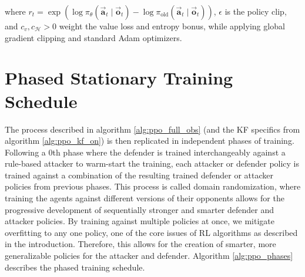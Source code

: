 where \(r_t=\exp\!\left(\log\pi_\theta(\vec{\mathbf{a}}_t \mid \vec{\mathbf{o}}_t)-\log\pi_{\mathrm{old}}(\vec{\mathbf{a}}_t \mid \vec{\mathbf{o}}_t)\right)\),
\(\epsilon\) is the policy clip, and \(c_v,c_{\mathcal{H}}>0\) weight the value loss and entropy bonus, while applying global gradient clipping and standard Adam optimizers.


\section{Phased Stationary Training Schedule}
\label{sec:phased-stationary-training}

The process described in algorithm \ref{alg:ppo_full_obs} (and the KF specifics from algorithm \ref{alg:ppo_kf_on}) is then replicated in independent phases of training. Following a 0th phase where the defender is trained interchangeably against a rule-based attacker to warm-start the training, each attacker or defender policy is trained against a combination of the resulting trained defender or attacker policies from previous phases. This process is called domain randomization, where training the agents against different versions of their opponents allows for the progressive development of sequentially stronger and smarter defender and attacker policies. By training against multiple policies at once, we mitigate overfitting to any one policy, one of the core issues of RL algorithms as described in the introduction. Therefore, this allows for the creation of smarter, more generalizable policies for the attacker and defender. Algorithm \ref{alg:ppo_phases} describes the phased training schedule.



